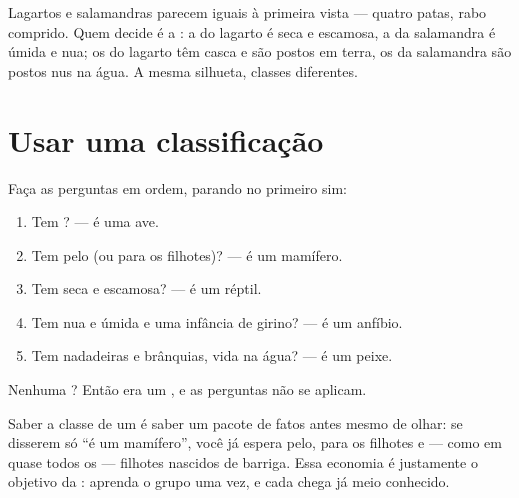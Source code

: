 \begin{remark}\label{rem:g4:classifying-animals:confusion}
Lagartos e salamandras parecem iguais à primeira vista --- quatro
patas, rabo comprido. Quem decide é a : a do lagarto é seca e
escamosa, a da salamandra é úmida e nua; os  do lagarto têm
casca e são postos em terra, os da salamandra são postos nus na
água. A mesma silhueta, classes diferentes.
\end{remark}

\section{Usar uma classificação}

\begin{method}\label{met:g4:classifying-animals:place}
Faça as perguntas em ordem, parando no primeiro sim:
\begin{enumerate}
  \item Tem ? --- é uma ave.
  \item Tem pelo (ou  para os filhotes)? --- é um mamífero.
  \item Tem  seca e escamosa? --- é um réptil.
  \item Tem  nua e úmida e uma infância de girino? --- é um
        anfíbio.
  \item Tem nadadeiras e brânquias, vida na água? --- é um peixe.
\end{enumerate}
Nenhuma ? Então era um , e as perguntas
não se aplicam.
\end{method}

\begin{proposition}\label{prop:g4:classifying-animals:free}
Saber a classe de um  é saber um pacote de fatos antes mesmo
de olhar: se disserem só ``é um mamífero'', você já espera pelo,
 para os filhotes e --- como em quase todos os  ---
filhotes nascidos de barriga. Essa economia é justamente o objetivo
da : aprenda o grupo uma vez, e cada  chega já
meio conhecido.
\end{proposition}
\admitted

